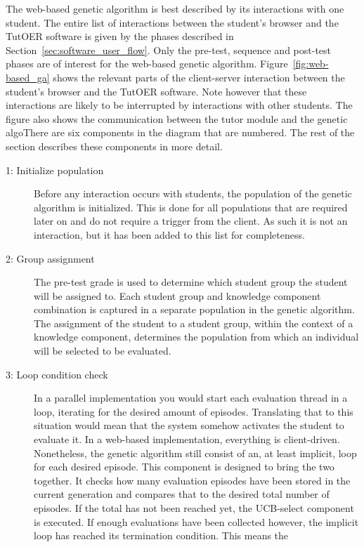 The web-based genetic algorithm is best described by its interactions with one
student. The entire list of interactions between the student's browser and the
TutOER software is given by the phases described in Section~\ref{sec:software_user_flow}.
Only the pre-test, sequence and post-test phases are of interest for the web-based
genetic algorithm. Figure~\ref{fig:web-based_ga} shows the relevant parts
of the client-server interaction between the student's browser and the TutOER
software. Note however that these interactions are likely to be interrupted by
interactions with other students. The figure also shows the communication between
the tutor module and the genetic algoThere are six components in the diagram that are
numbered. The rest of the section describes these components in more detail.

\begin{description}
	\item[1: Initialize population] Before any interaction occurs with students,
		the population of the genetic algorithm is initialized. This is done for
		all populations that are required later on and do not require a
		trigger from the client. As such it is not an interaction, but it has
		been added to this list for completeness.
	\item[2: Group assignment] The pre-test grade is used to determine
		which student group the student will be assigned to. Each student
		group and knowledge component combination is captured in a separate
		population in the genetic algorithm. The assignment of the student to a
		student group, within the context of a knowledge component, determines
		the population from which an individual will be selected to be
		evaluated.
	\item[3: Loop condition check] In a parallel implementation you would start
		each evaluation thread in a loop, iterating for the desired amount of
		episodes. Translating that to this situation would mean that the system
		somehow activates the student to evaluate it. In a web-based
		implementation, everything is client-driven. Nonetheless, the genetic
		algorithm still consist of an, at least implicit, loop for each desired
		episode. This component is designed to bring the two together. It
		checks how many evaluation episodes have been stored in the current
		generation and compares that to the desired total number of episodes.
		If the total has not been reached yet, the UCB-select component is
		executed. If enough evaluations have been collected however, the
		implicit loop has reached its termination condition. This means the

\end{description}
